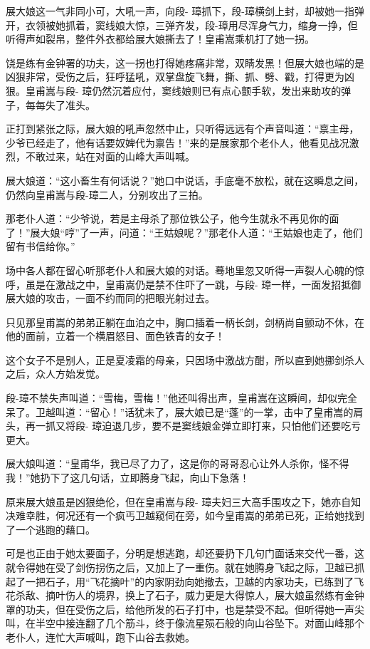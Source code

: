 \documentclass[12pt,oneside]{book}
\begin{document}
展大娘这一气非同小可，大吼一声，向段-
璋抓下，段-璋横剑上封，却被她一指弹开，衣领被她抓着，窦线娘大惊，三弹齐发，段-璋用尽浑身气力，缩身一挣，但听得声如裂帛，整件外衣都给展大娘撕去了！皇甫嵩乘机打了她一拐。

饶是练有金钟署的功夫，这一拐也打得她疼痛非常，双睛发黑！但展大娘也端的是凶狠非常，受伤之后，狂呼猛吼，双掌盘旋飞舞，撕、抓、劈、戳，打得更为凶狠。皇甫嵩与段-
璋仍然沉着应付，窦线娘则已有点心颤手软，发出来助攻的弹子，每每失了准头。

正打到紧张之际，展大娘的吼声忽然中止，只听得远远有个声音叫道：``禀主母，少爷已经走了，他有话要奴婢代为禀告！''来的是展家那个老仆人，他看见战况激烈，不敢过来，站在对面的山峰大声叫喊。

展大娘道：``这小畜生有何话说？''她口中说话，手底毫不放松，就在这瞬息之间，仍然向皇甫嵩与段-璋二人，分别攻出了三拍。

那老仆人道：``少爷说，若是主母杀了那位铁公子，他今生就永不再见你的面了！''展大娘``哼''了一声，问道：``王姑娘呢？''那老仆人道：``王姑娘也走了，他们留有书信给你。''

场中各人都在留心听那老仆人和展大娘的对话。蓦地里忽又听得一声裂人心魄的惊呼，虽是在激战之中，皇甫嵩仍是禁不住吓了一跳，与段-
璋一样，一面发招抵御展大娘的攻击，一面不约而同的把眼光射过去。

只见那皇甫嵩的弟弟正躺在血泊之中，胸口插着一柄长剑，剑柄尚自颤动不休，在他的面前，立着一个横眉怒目、面色铁青的女子！

这个女子不是别人，正是夏凌霜的母亲，只因场中激战方酣，所以直到她挪剑杀人之后，众人方始发觉。

段-璋不禁失声叫道：``雪梅，雪梅！''他还叫得出声，皇甫嵩在这瞬间，却似完全呆了。卫越叫道：``留心！''话犹未了，展大娘已是``蓬''的一掌，击中了皇甫嵩的肩头，再一抓又将段-
璋迫退几步，要不是窦线娘金弹立即打来，只怕他们还要吃亏更大。

展大娘叫道：``皇甫华，我已尽了力了，这是你的哥哥忍心让外人杀你，怪不得我！''她扔下了这几句话，立即腾身飞起，向山下急落！

原来展大娘虽是凶狠绝伦，但在皇甫嵩与段-
璋夫妇三大高手围攻之下，她亦自知决难幸胜，何况还有一个疯丐卫越窥伺在旁，如今皇甫嵩的弟弟已死，正给她找到了一个逃跑的藉口。

可是也正由于她太要面子，分明是想逃跑，却还要扔下几句门面话来交代一番，这就令得她在受了剑伤拐伤之后，又加上了一重伤。就在她腾身飞起之际，卫越已抓起了一把石子，用``飞花摘叶''的内家阴劲向她撤去，卫越的内家功夫，已练到了飞花杀敌、摘叶伤人的境界，换上了石子，威力更是大得惊人，展大娘虽然练有金钟罩的功夫，但在受伤之后，给他所发的石子打中，也是禁受不起。但听得她一声尖叫，在半空中接连翻了几个筋斗，终于像流星殒石般的向山谷坠下。对面山峰那个老仆人，连忙大声喊叫，跑下山谷去救她。
\end{document}
